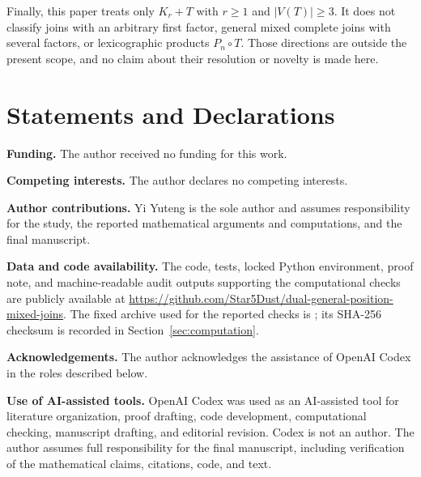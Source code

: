 \documentclass[11pt,a4paper]{article}
\numberwithin{equation}{section}
\begin{document}
Finally, this paper treats only \(K_r+T\) with \(r\ge 1\) and
\(|V(T)|\ge 3\). It does not classify joins with an arbitrary first
factor, general mixed complete joins with several factors, or
lexicographic products \(P_n\circ T\). Those directions are outside the
present scope, and no claim about their resolution or novelty is made
here.

\enlargethispage{2\baselineskip}
\section*{Statements and Declarations}

\noindent\textbf{Funding.}
The author received no funding for this work.

\medskip
\noindent\textbf{Competing interests.}
The author declares no competing interests.

\medskip
\noindent\textbf{Author contributions.}
Yi Yuteng is the sole author and assumes responsibility for the study, the
reported mathematical arguments and computations, and the final manuscript.

\medskip
\noindent\textbf{Data and code availability.}
The code, tests, locked Python environment, proof note, and machine-readable
audit outputs supporting the computational checks are publicly available at
\url{https://github.com/Star5Dust/dual-general-position-mixed-joins}. The fixed
archive used for the reported checks is
; its SHA-256 checksum is
recorded in Section~\ref{sec:computation}.

\medskip
\noindent\textbf{Acknowledgements.}
The author acknowledges the assistance of OpenAI Codex in the roles described
below.

\medskip
\noindent\textbf{Use of AI-assisted tools.}
OpenAI Codex was used as an AI-assisted tool for literature organization,
proof drafting, code development, computational checking, manuscript drafting,
and editorial revision. Codex is not an author. The author assumes full
responsibility for the final manuscript, including verification of the
mathematical claims, citations, code, and text.
\end{document}
